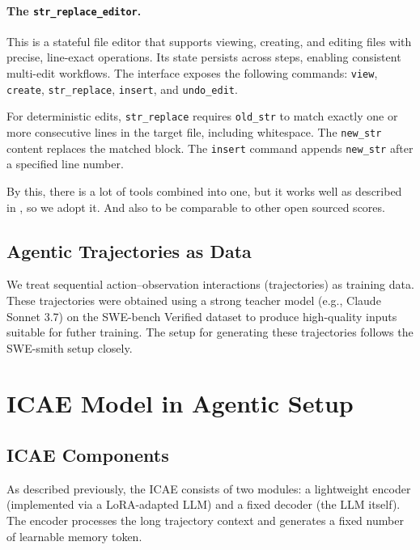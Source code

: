\paragraph{The \texttt{str\_replace\_editor}.}
This is a stateful file editor that supports viewing, creating, and editing files with precise, line-exact operations.
Its state persists across steps, enabling consistent multi-edit workflows. 
The interface exposes the following commands: \texttt{view}, \texttt{create}, \texttt{str\_replace}, \texttt{insert}, and \texttt{undo\_edit}. 

For deterministic edits, \texttt{str\_replace} requires \texttt{old\_str} to match exactly one or more consecutive lines in the target file, including whitespace.
The \texttt{new\_str} content replaces the matched block.
The \texttt{insert} command appends \texttt{new\_str} after a specified line number.

By this, there is a lot of tools combined into one, but it works well as described in \cite{swe-smith}, so we adopt it. 
And also to be comparable to other open sourced scores.

\subsection{Agentic Trajectories as Data}
We treat sequential action--observation interactions (trajectories) as training data.
These trajectories were obtained using a strong teacher model (e.g., Claude Sonnet 3.7) on the SWE-bench Verified dataset to produce high-quality inputs suitable for futher training.
The setup for generating these trajectories follows the SWE-smith setup closely\cite{swe-smith}.

\section{ICAE Model in Agentic Setup}

\subsection{ICAE Components}
As described previously, the ICAE \cite{ge_context_2024} consists of two modules: a lightweight encoder (implemented via a LoRA-adapted LLM) and a fixed decoder (the LLM itself).
The encoder processes the long trajectory context and generates a fixed number of learnable memory token.

